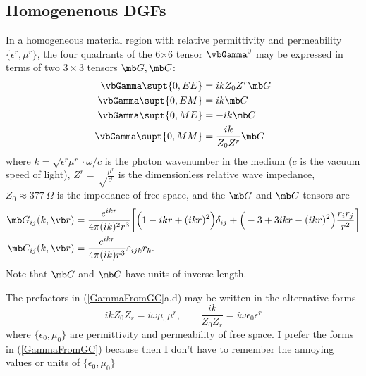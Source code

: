 \documentclass[letterpaper]{article}
\begin{document}
\subsection*{Homogenenous DGFs}

In a homogeneous material region with relative permittivity
and permeability $\{\epsilon^r, \mu^r\}$, the four quadrants of
the 6$\times$6 tensor $\vbGamma^0$ may be expressed in terms of
two $3\times 3$ tensors $\mb G, \mb C$:
\begin{subequations}
\begin{align}
 \vbGamma\supt{0,EE} &= ikZ_0 Z^r \mb G \\
 \vbGamma\supt{0,EM} &= ik        \mb C \\
 \vbGamma\supt{0,ME} &= -ik       \mb C \\
 \vbGamma\supt{0,MM} &= \frac{ik}{Z_0 Z^r} \mb G
\end{align}
\label{GammaFromGC}
\end{subequations}
where $k=\sqrt{\epsilon^r \mu^r}\cdot \omega/c$
is the photon wavenumber in the medium ($c$ is the vacuum speed 
of light),
$Z^r=\sqrt\frac{\mu^r}{\epsilon^r}$ is the dimensionless relative
wave impedance,
$Z_0\approx 377\,\Omega$ is the impedance of free space, and
the $\mb G$ and $\mb C$ tensors are
\begin{subequations}
\begin{align}
\mb G_{ij}(k,\vb r) 
 &= \frac{e^{ikr}}{4\pi (ik)^2 r^3}
    \bigg[ \Big(1-ikr + (ikr)^2 \Big)\delta_{ij}
          +\Big(-3 + 3ikr - (ikr)^2 \Big)\frac{r_i r_j}{r^2}
    \bigg]
\\
\mb C_{ij}(k,\vb r) 
 &= \frac{e^{ikr}}{4\pi (ik) r^3} \varepsilon_{ijk} r_k.
\end{align}
\label{GCDef}
\end{subequations}
Note that $\mb G$ and $\mb C$ have units of inverse length.

The prefactors in (\ref{GammaFromGC}a,d) may be written in the
alternative forms
$$ ikZ_0 Z_r = i\omega \mu_0 \mu^r, \qquad 
   \frac{ik}{Z_0 Z_r} = i\omega \epsilon_0 \epsilon^r
$$ 
where $\{\epsilon_0,\mu_0\}$ are permittivity and permeability of
free space. I prefer the forms in (\ref{GammaFromGC}) because
then I don't have to remember the annoying values or units of
$\{\epsilon_0, \mu_0\}$
\end{document}
